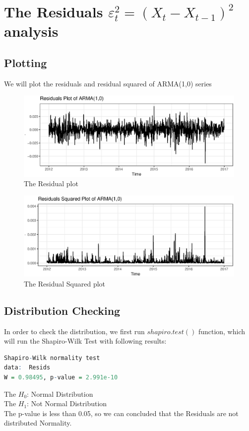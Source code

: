 \label{sec:04TheResidualsanalysis}
\section{The Residuals $\varepsilon_t^2 = (X_t - X_{t-1})^2$ analysis}
\subsection{Plotting}
We will plot the residuals and residual squared of ARMA(1,0) series
\FloatBarrier
\begin{figure}[!htbp]
  \centering
  \includegraphics[width=\textwidth]{img/Fig8.eps}
  \caption{The Residual plot}
\end{figure}
\FloatBarrier
\FloatBarrier
\begin{figure}[!htbp]
  \centering
  \includegraphics[width=\textwidth]{img/Fig9.eps}
  \caption{The Residual Squared plot}
\end{figure}
\FloatBarrier
\subsection{Distribution Checking}
In order to check the distribution, we first run $shapiro.test()$ function, which will run the Shapiro-Wilk Test \cite{royston1982extension} with following results:
\begin{lstlisting}[language=R, caption=Shapiro-Wilk normality test]
Shapiro-Wilk normality test
data:  Resids
W = 0.98495, p-value = 2.991e-10
\end{lstlisting}
The $H_0$: Normal Distribution \\
The $H_1$: Not Normal Distribution \\
The p-value is less than 0.05, so we can concluded that the Residuals are not distributed Normality. 

